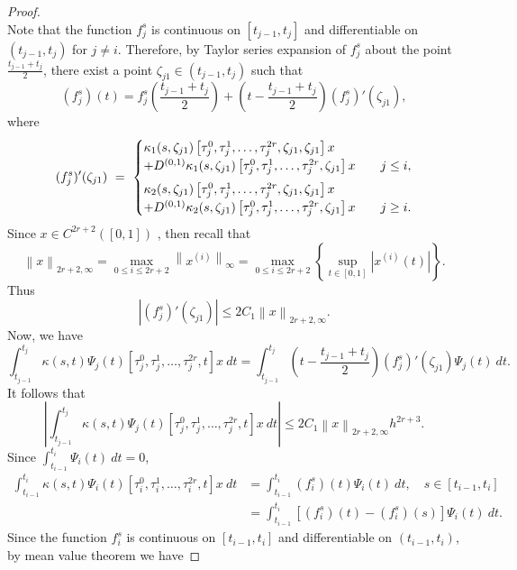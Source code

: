 \documentclass[sn-mathphys-num]{sn-jnl}%
\theoremstyle{thmstyleone}%
\theoremstyle{thmstyletwo}%
\theoremstyle{thmstylethree}%
\newcommand{\norm}[1]{\left\lVert #1\right\rVert}
\begin{document}
\begin{proof}
\begin{equation*}
	\end{equation*} 
	Note that the function $f_j^s$ is continuous on $[t_{j-1}, t_j]$ and differentiable on $(t_{j-1}, t_j)$ for $j \ne i$. Therefore, by Taylor series expansion of $f_j^s$ about the point $\frac{t_{j-1}+t_j}{2}$, there exist a point $\zeta_{j1} \in (t_{j-1}, t_j)$ such that
	$$
	(f_j^s)(t) = f_j^s \left(\frac{t_{j-1}+t_j}{2}\right) + \left(t - \frac{t_{j-1}+t_j}{2}\right) (f_j^s)'(\zeta_{j1}),
	$$ 
	where
	\begin{equation*}
	(f_j^s)'(\zeta_{j1}) ~= ~
	\begin{cases}
	\kappa_1(s,\zeta_{j1}) \left[\tau_j^0,\tau_j^1,\ldots, \tau_j^{2r},\zeta_{j1}, \zeta_{j1} \right]x \\
	+ D^{(0,1)} \kappa_1(s,\zeta_{j1}) \left[\tau_j^0,\tau_j^1,\ldots, \tau_j^{2r},\zeta_{j1} \right]x~~~          &  j \le i,\vspace*{1.5mm}\\ 
		\kappa_2(s,\zeta_{j1}) \left[\tau_j^0,\tau_j^1,\ldots, \tau_j^{2r},\zeta_{j1}, \zeta_{j1} \right]x \\
	+  D^{(0,1)} \kappa_2(s,\zeta_{j1}) \left[\tau_j^0,\tau_j^1,\ldots, \tau_j^{2r},\zeta_{j1} \right]x~~~          & j \ge i.\\
	\end{cases}
	\end{equation*}
	Since $x \in C^{2r+2}([0,1])$ , then recall that
	$$
	\norm{x}_{2r + 2, \infty} = \max_{0 \le i \le 2r +2} \norm{x^{(i)}}_\infty = \max_{0 \le i \le 2r +2} \left\{  \sup_{t \in [0,1]} \left|x^{(i)}(t)\right| \right\}.
	$$   
	Thus 
	$$
	\left|(f_j^s)'(\zeta_{j1}) \right| \le 2 C_1 \norm{x}_{2r +2, \infty}.
	$$
	Now, we have
	$$
	\int_{t_{j-1}}^{t_j}  \kappa(s,t) \Psi_j(t) \left[\tau_j^0,\tau_j^1,\ldots, \tau_j^{2r},t\right]x ~dt = \int_{t_{j-1}}^{t_j}  \left(t - \frac{t_{j-1}+t_j}{2}\right) (f_j^s)'(\zeta_{j1}) \Psi_j(t) ~dt.
	$$
	It follows that 
	$$
	\left|\int_{t_{j-1}}^{t_j}  \kappa(s,t) \Psi_j(t) \left[\tau_j^0,\tau_j^1,\ldots, \tau_j^{2r},t\right]x ~dt \right| \le  2 C_1 \norm{x}_{2r +2, \infty} h^{2r + 3}.
	$$
	Since $\displaystyle{\int_{t_{i-1}}^{t_i} \Psi_i(t) ~dt =0}$,
	\begin{align*}
		\int_{t_{i-1}}^{t_i}  \kappa(s,t) \Psi_i(t) \left[\tau_i^0,\tau_i^1,\ldots, \tau_i^{2r},t\right]x ~dt &= \int_{t_{i-1}}^{t_i}   (f_i^s)(t) \Psi_i(t) ~dt, \quad s \in [t_{i-1},t_i] \\
		&= \int_{t_{i-1}}^{t_i}   [(f_i^s)(t)-(f_i^s)(s)] \Psi_i(t) ~dt.
	\end{align*}
	Since the function $f_i^s$ is continuous on $[t_{i-1}, t_i]$ and differentiable on $(t_{i-1}, t_i)$, by mean value theorem we have 

\end{proof}
\end{document}
